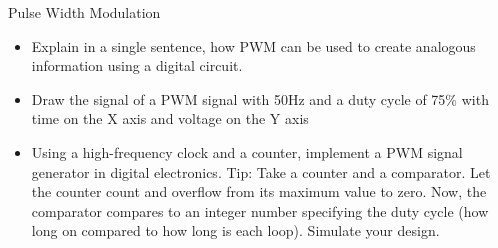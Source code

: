 \begin{task}{Pulse Width Modulation}{}{}
  \begin{itemize}
    \item{Explain in a single sentence, how PWM can be used to create analogous information
      using a digital circuit.}
    \item{Draw the signal of a PWM signal with 50Hz and a duty cycle of 75\% with time on
          the X axis and voltage on the Y axis}
    \item{Using a high-frequency clock and a counter, implement a PWM signal generator in digital electronics. Tip: Take a counter and a comparator. Let the counter count and overflow from its maximum value to zero. Now, the comparator compares to an integer number specifying the duty cycle (how long on compared to how long is each loop). Simulate your design.}
      \end{itemize}
\end{task}
